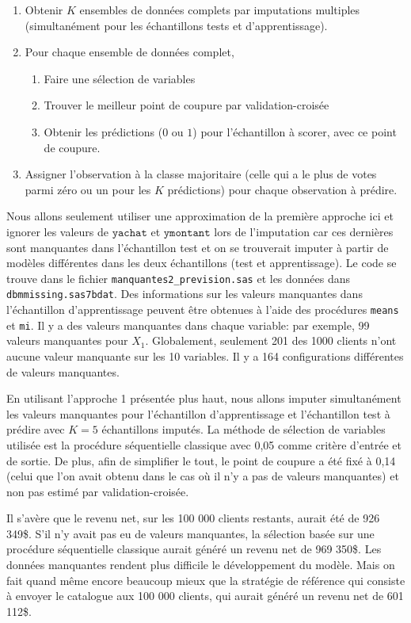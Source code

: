 \documentclass[
  11pt,
  letterpaper,
]{book}
\providecommand{\tightlist}{%
  \setlength{\itemsep}{0pt}\setlength{\parskip}{0pt}}
\theoremstyle{definition}
\theoremstyle{definition}
\theoremstyle{definition}
\theoremstyle{definition}
\theoremstyle{remark}
\begin{document}
\begin{enumerate}
\def\labelenumi{\arabic{enumi})}
\tightlist
\item
  Obtenir \(K\) ensembles de données complets par imputations multiples (simultanément pour les échantillons tests et d'apprentissage).
\item
  Pour chaque ensemble de données complet,

  \begin{enumerate}
  \def\labelenumii{\alph{enumii}.}
  \tightlist
  \item
    Faire une sélection de variables
  \item
    Trouver le meilleur point de coupure par validation-croisée
  \item
    Obtenir les prédictions (\(0\) ou \(1\)) pour l'échantillon à scorer, avec ce point de coupure.
  \end{enumerate}
\item
  Assigner l'observation à la classe majoritaire (celle qui a le plus de votes parmi zéro ou un pour les \(K\) prédictions) pour chaque observation à prédire.
\end{enumerate}

Nous allons seulement utiliser une approximation de la première approche ici et ignorer les valeurs de \(\texttt{yachat}\) et \(\texttt{ymontant}\) lors de l'imputation car ces dernières sont manquantes dans l'échantillon test et on se trouverait imputer à partir de modèles différentes dans les deux échantillons (test et apprentissage). Le code se trouve dans le fichier \texttt{manquantes2\_prevision.sas} et les données dans \texttt{dbmmissing.sas7bdat}. Des informations sur les valeurs manquantes dans l'échantillon d'apprentissage peuvent être obtenues à l'aide des procédures \texttt{means} et \texttt{mi}. Il y a des valeurs manquantes dans chaque variable: par exemple, 99 valeurs manquantes pour \(X_1\). Globalement, seulement 201 des 1000 clients n'ont aucune valeur manquante sur les 10 variables. Il y a 164 configurations différentes de valeurs manquantes.

En utilisant l'approche 1 présentée plus haut, nous allons imputer simultanément les valeurs manquantes pour l'échantillon d'apprentissage et l'échantillon test à prédire avec \(K=5\) échantillons imputés. La méthode de sélection de variables utilisée est la procédure séquentielle classique avec 0,05 comme critère d'entrée et de sortie. De plus, afin de simplifier le tout, le point de coupure a été fixé à 0,14 (celui que l'on avait obtenu dans le cas où il n'y a pas de valeurs manquantes) et non pas estimé par validation-croisée.

Il s'avère que le revenu net, sur les 100 000 clients restants, aurait été de 926 349\$. S'il n'y avait pas eu de valeurs manquantes, la sélection basée sur une procédure séquentielle classique aurait généré un revenu net de 969 350\$. Les données manquantes rendent plus difficile le développement du modèle. Mais on fait quand même encore beaucoup mieux que la stratégie de référence qui consiste à envoyer le catalogue aux 100 000 clients, qui aurait généré un revenu net de 601 112\$.

  
\end{document}
